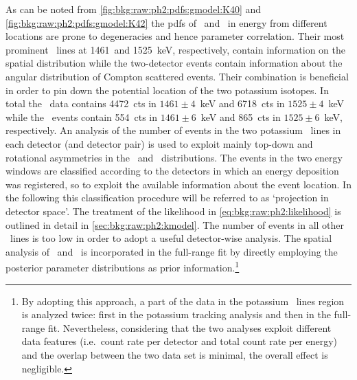 As can be noted from \cref{fig:bkg:raw:ph2:pdfs:gmodel:K40} and
\cref{fig:bkg:raw:ph2:pdfs:gmodel:K42} the pdfs of \kvn\ and \kvz\ in energy from
different locations are prone to degeneracies and hence parameter correlation. Their most
prominent \g\ lines at 1461~and 1525~keV, respectively, contain information on the spatial
distribution while the two-detector events contain information about the angular
distribution of Compton scattered events. Their combination is beneficial in order to pin
down the potential location of the two potassium isotopes. In total the \Mone\ data
contains 4472~cts in $1461 \pm 4$~keV and 6718~cts in $1525 \pm 4$~keV while the \Mtwo\
events contain 554~cts in $1461 \pm 6$~keV and 865~cts in $1525 \pm 6$~keV, respectively.
An analysis of the number of events in the two potassium \g\ lines in each detector (and
detector pair) is used to exploit mainly top-down and rotational asymmetries in the \kvn\
and \kvz\ distributions. The events in the two energy windows are classified according to
the detectors in which an energy deposition was registered, so to exploit the available
information about the event location. In the following this classification procedure will
be referred to as `projection in detector space'. The treatment of the likelihood
in \cref{eq:bkg:raw:ph2:likelihood} is outlined in detail in
\cref{sec:bkg:raw:ph2:kmodel}.  The number of events in all other \g\ lines is too low in
order to adopt a useful detector-wise analysis. The spatial analysis of \kvn\ and \kvz\ is
incorporated in the full-range fit by directly employing the posterior parameter
distributions as prior information.\footnote{%
  By adopting this approach, a part of the data in the potassium \g\ lines region is
  analyzed twice: first in the potassium tracking analysis and then in the full-range fit.
  Nevertheless, considering that the two analyses exploit different data features
  (i.e.~count rate per detector and total count rate per energy) and the overlap between
  the two data set is minimal, the overall effect is negligible.
}

